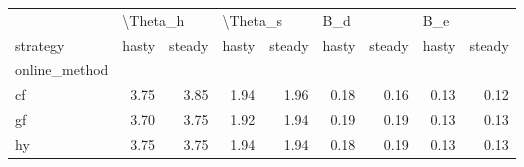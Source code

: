 \begin{tabular}{lrrrrrrrr}
\toprule
{} & \multicolumn{2}{l}{\textbackslash Theta\_h} & \multicolumn{2}{l}{\textbackslash Theta\_s} & \multicolumn{2}{l}{B\_d} & \multicolumn{2}{l}{B\_e} \\
strategy &    hasty & steady &    hasty & steady & hasty & steady & hasty & steady \\
online\_method &          &        &          &        &       &        &       &        \\
\midrule
cf            &     3.75 &   3.85 &     1.94 &   1.96 &  0.18 &   0.16 &  0.13 &   0.12 \\
gf            &     3.70 &   3.75 &     1.92 &   1.94 &  0.19 &   0.19 &  0.13 &   0.13 \\
hy            &     3.75 &   3.75 &     1.94 &   1.94 &  0.18 &   0.19 &  0.13 &   0.13 \\
\bottomrule
\end{tabular}
